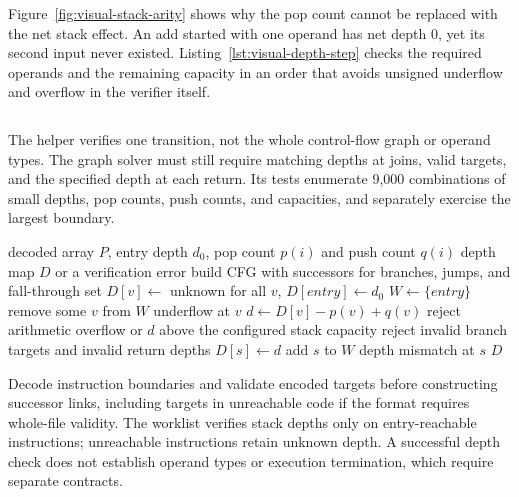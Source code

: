 Figure~\ref{fig:visual-stack-arity} shows why the pop count cannot be replaced with the net stack effect.
An add started with one operand has net depth $0$, yet its second input never existed.
Listing~\ref{lst:visual-depth-step} checks the required operands and the remaining capacity in an order that avoids unsigned underflow and overflow in the verifier itself.




\begin{listing}[htbp]
  \inputminted{c}{example-code/visual-labs/depth.c}
  \caption{A checked depth transition validates operand availability before calculating the resulting depth.}
  \label{lst:visual-depth-step}
\end{listing}

The helper verifies one transition, not the whole control-flow graph or operand types.
The graph solver must still require matching depths at joins, valid targets, and the specified depth at each return.
Its tests enumerate 9,000 combinations of small depths, pop counts, push counts, and capacities, and separately exercise the largest  boundary.

\begin{algorithm}[htbp]
\caption{Stack-depth verification over a bytecode control-flow graph}\label{alg:ch31-verify}
\begin{pseudocode}
\Require decoded array $P$, entry depth $d_0$, pop count $p(i)$ and push count $q(i)$
\Ensure depth map $D$ or a verification error
\State build CFG with successors for branches, jumps, and fall-through
\State set $D[v] \gets$ unknown for all $v$, $D[entry] \gets d_0$
\State $W \gets \{entry\}$
\State remove some $v$ from $W$
\State \Return underflow at $v$
\EndIf
\State $d \gets D[v]-p(v)+q(v)$
\State reject arithmetic overflow or $d$ above the configured stack capacity
\State reject invalid branch targets and invalid return depths
\State $D[s] \gets d$
\State add $s$ to $W$
\State \Return depth mismatch at $s$
\EndIf
\EndFor
\EndWhile
\State \Return $D$
\end{pseudocode}
\end{algorithm}

Decode instruction boundaries and validate encoded targets before constructing successor links, including targets in unreachable code if the format requires whole-file validity.
The worklist verifies stack depths only on entry-reachable instructions; unreachable instructions retain unknown depth.
A successful depth check does not establish operand types or execution termination, which require separate contracts.

